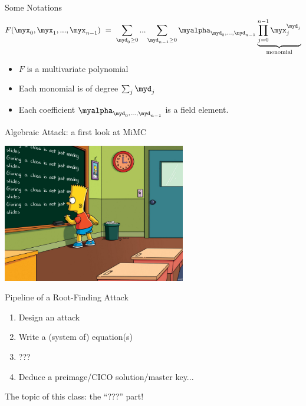 \documentclass[aspectratio=169]{beamer}
\begin{document}
\begin{frame}{Some Notations}
  \begin{equation*}
    F(\myx_0, \myx_1, ..., \myx_{n-1}) ~=~ \sum_{\myd_0 \geq 0} ... \sum_{\myd_{n-1}\geq 0} \myalpha_{\myd_0,...,\myd_{n-1}} \underbrace{\prod_{j=0}^{n-1}\myx_j^{\myd_j}}_{\text{monomial}}
  \end{equation*}

  \begin{itemize}
  \item $F$ is a \alert{multivariate polynomial}
  \item Each \alert{monomial} is of degree $\sum_j \myd_j$
  \item Each \alert{coefficient} $\myalpha_{\myd_0,...,\myd_{n-1}}$ is a field element.
  \end{itemize}

\end{frame}

\begin{frame}{Algebraic Attack: a first look at MiMC}
  \vfill

  \begin{center}
    \includegraphics[width=8cm]{./figures/simpsons}
  \end{center}
  
  \vfill
\end{frame}


\begin{frame}{Pipeline of a Root-Finding Attack}

  \begin{enumerate}
    \setlength\itemsep{0.4cm}
  \item Design an attack \pause
  \item Write a (system of) equation(s) \pause
  \item \alert{???} \pause
  \item Deduce a preimage/CICO solution/master key...
  \end{enumerate}

  \pause\vspace{0.4cm}

  \begin{center}
    { \large
      The topic of this class: the ``\alert{???}'' part!
    }      
  \end{center}
\end{frame}
\end{document}
